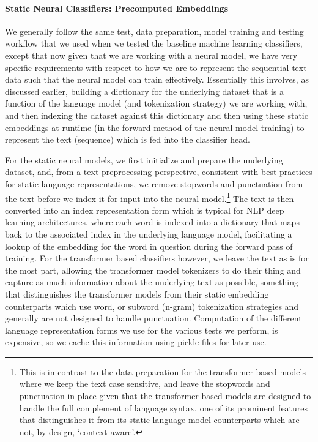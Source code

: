 \documentclass[final]{clv2025}
\begin{document}
\paragraph{Static Neural Classifiers: Precomputed Embeddings}
We generally follow the same test, data preparation, model training and testing workflow that we used when we tested the baseline machine learning classifiers, except that now given that we are working with a neural model, we have very specific requirements with respect to how we are to represent the sequential text data such that the neural model can train effectively. Essentially this involves, as discussed earlier, building a dictionary for the underlying dataset that is a function of the language model (and tokenization strategy) we are working with, and then indexing the dataset against this dictionary and then using these static embeddings at runtime (in the forward method of the neural model training) to represent the text (sequence) which is fed into the classifier head.

For the static neural models, we first initialize and prepare the underlying dataset, and, from a text preprocessing perspective, consistent with best practices for static language representations, we remove stopwords and punctuation from the text before we index it for input into the neural model.\footnote{This is in contrast to the data preparation for the transformer based models where we keep the text case sensitive, and leave the stopwords and punctuation in place given that the transformer based models are designed to handle the full complement of language syntax, one of its prominent features that distinguishes it from its static language model counterparts which are not, by design, ‘context aware’.} The text is then converted into an index representation form which is typical for NLP deep learning architectures, where each word is indexed into a dictionary that maps back to the associated index in the underlying language model, facilitating a lookup of the embedding for the word in question during the forward pass of training. For the transformer based classifiers however, we leave the text as is for the most part, allowing the transformer model tokenizers to do their thing and capture as much information about the underlying text as possible, something that distinguishes the transformer models from their static embedding counterparts which use word, or subword (n-gram) tokenization strategies and generally are not designed to handle punctuation. Computation of the different language representation forms we use for the various tests we perform, is expensive, so we cache this information using pickle files for later use. 
\end{document}
